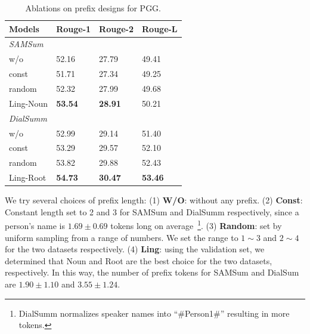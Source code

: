 \begin{table}[th]
	\scriptsize
	\centering
	\begin{tabular}{llll}
		\toprule[1pt]
		\textbf{Models} & \textbf{Rouge-1} & \textbf{Rouge-2} & \textbf{Rouge-L} \\
		\midrule[1pt] 
		\multicolumn{4}{l}{\textit{SAMSum}} \\
		{w/o} & 52.16 & 27.79& 49.41\\
		{const} & 51.71& 27.34&49.25 \\
		{random} & 52.32& 27.99&49.68 \\
		{Ling-Noun} &\textbf{53.54} & \textbf{28.91}&50.21\\
		\midrule[1pt]
		\multicolumn{4}{l}{\textit{DialSumm}} \\
		{w/o} & 52.99& 29.14&51.40 \\
		{const} &53.29 &29.57 &52.10 \\
		{random} &53.82 & 29.88&52.43\\
		{Ling-Root} &\textbf{54.73} & \textbf{30.47}&\textbf{53.46}\\
		\bottomrule[1pt]
	\end{tabular}
	\caption{Ablations on prefix designs for PGG.}
	\label{tab:prefixablation}
\end{table}

We try several choices of prefix length:
(1) \textbf{W/O}: without any prefix.
(2) \textbf{Const}: Constant length set to 2 and 3 for SAMSum and
DialSumm respectively, since a person's name is $1.69\pm0.69$ tokens long
on average~\footnote{DialSumm normalizes speaker names 
into ``\#Person1\#'' resulting in more tokens.}.
(3) \textbf{Random}: set by uniform sampling from a range of numbers. 
We set the range to $1\sim3$ and $2\sim4$ for the two datasets respectively.
(4) \textbf{Ling}: using the validation set, we determined that Noun and Root 
are the best choice for the two datasets, respectively. In this way, the number of prefix tokens for SAMSum and DialSum are $1.90\pm1.10$ and $3.55\pm1.24$.


